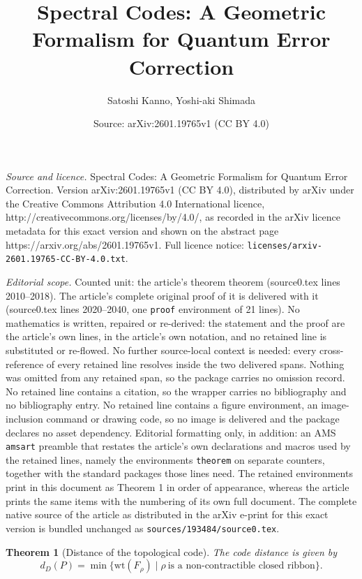 \documentclass[10pt,a4paper]{amsart}
\title{Spectral Codes: A Geometric Formalism for Quantum Error Correction}
\author{Satoshi Kanno, Yoshi-aki Shimada}
\date{Source: arXiv:2601.19765v1 (CC BY 4.0)}
\newtheorem{theorem}{Theorem}
\begin{document}
\maketitle

\noindent\emph{Source and licence.} Spectral Codes: A Geometric Formalism for Quantum Error Correction. Version arXiv:2601.19765v1 (CC BY 4.0), distributed by arXiv under the Creative Commons Attribution 4.0 International licence, http://creativecommons.org/licenses/by/4.0/, as recorded in the arXiv licence metadata for this exact version and shown on the abstract page https://arxiv.org/abs/2601.19765v1. Full licence notice: \texttt{licenses/arxiv-2601.19765-CC-BY-4.0.txt}.\par\smallskip

\noindent\textit{Editorial scope.} Counted unit: the article's theorem theorem (source0.tex lines 2010--2018). The article's complete original proof of it is delivered with it (source0.tex lines 2020--2040, one \texttt{proof} environment of 21 lines). No mathematics is written, repaired or re-derived: the statement and the proof are the article's own lines, in the article's own notation, and no retained line is substituted or re-flowed.  No further source-local context is needed: every cross-reference of every retained line resolves inside the two delivered spans.  Nothing was omitted from any retained span, so the package carries no omission record.  No retained line contains a citation, so the wrapper carries no bibliography and no bibliography entry.  No retained line contains a figure environment, an image-inclusion command or drawing code, so no image is delivered and the package declares no asset dependency.  Editorial formatting only, in addition: an AMS \texttt{amsart} preamble that restates the article's own declarations and macros used by the retained lines, namely the environments \texttt{theorem} on separate counters, together with the standard packages those lines need.  The retained environments print in this document as Theorem 1 in order of appearance, whereas the article prints the same items with the numbering of its own full document.  The complete native source of the article as distributed in the arXiv e-print for this exact version is bundled unchanged as \texttt{sources/193484/source0.tex}.
\begin{theorem}[Distance of the topological code]
The code distance is given by
\[
    d_D(P)
    =
    \min\{\mathrm{wt}(F_\rho)\mid
    \rho\ \text{is a non-contractible closed ribbon}\}.
\]
\end{theorem}
\end{document}
